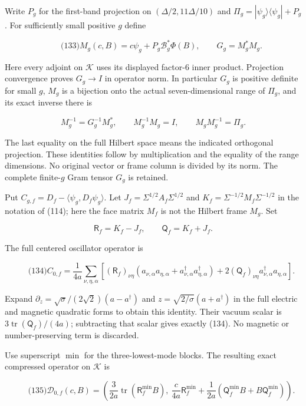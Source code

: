 Write \(P_g\) for the first-band projection on
\((\Delta/2,11\Delta/10)\) and
\(\Pi_g=|\psi_g\rangle\langle\psi_g|+P_g\). For sufficiently small
positive \(g\) define

\[
\qquad\text{(133)}
 M_g(c,B)=c\psi_g+P_g\mathcal B_g^*\Phi(B),\qquad G_g=M_g^*M_g.
\]

Here every adjoint on \(\mathcal K\) uses its displayed factor-\(6\)
inner product. Projection convergence proves \(G_g\to I\) in operator
norm. In particular \(G_g\) is positive definite for small \(g\),
\(M_g\) is a bijection onto the actual seven-dimensional range of
\(\Pi_g\), and its exact inverse there is

\[
M_g^{-1}=G_g^{-1}M_g^*,\qquad
 M_g^{-1}M_g=I,\qquad M_gM_g^{-1}=\Pi_g.
\]

The last equality on the full Hilbert space means the indicated
orthogonal projection. These identities follow by multiplication and the
equality of the range dimensions. No original vector or frame column is
divided by its norm. The complete finite-\(g\) Gram tensor \(G_g\) is
retained.

Put \(C_{g,f}=D_f-\langle\psi_g,D_f\psi_g\rangle\). Let
\(J_f=\Sigma^{1/2}A_f\Sigma^{1/2}\) and
\(K_f=\Sigma^{-1/2}M_f\Sigma^{-1/2}\) in the notation of (114); here the
face matrix \(M_f\) is not the Hilbert frame \(M_g\). Set

\[
\mathsf R_f=K_f-J_f,\qquad \mathsf Q_f=K_f+J_f.
\]

The full centered oscillator operator is

\[
\qquad\text{(134)}
 C_{0,f}=\frac1{4a}\sum_{\nu,\eta,\alpha}
 \left[(\mathsf R_f)_{\nu\eta}
 (a_{\nu,\alpha}a_{\eta,\alpha}
       +a_{\nu,\alpha}^\dagger a_{\eta,\alpha}^\dagger)
       +2(\mathsf Q_f)_{\nu\eta}
                      a_{\nu,\alpha}^\dagger a_{\eta,\alpha}\right].
\]

Expand \(\partial_z=\sqrt{\sigma}/(2\sqrt2)(a-a^\dagger)\) and
\(z=\sqrt{2/\sigma}(a+a^\dagger)\) in the full electric and magnetic
quadratic forms to obtain this identity. Their vacuum scalar is
\(3\operatorname{tr}(\mathsf Q_f)/(4a)\); subtracting that scalar gives
exactly (134). No magnetic or number-preserving term is discarded.

Use superscript \(\min\) for the three-lowest-mode blocks. The resulting
exact compressed operator on \(\mathcal K\) is

\[
\qquad\text{(135)}
 \mathcal D_{0,f}(c,B)=
 \left(\frac{3}{2a}\operatorname{tr}(\mathsf R_f^{\min}B),
 \ \frac{c}{4a}\mathsf R_f^{\min}
       +\frac1{2a}(\mathsf Q_f^{\min}B+B\mathsf Q_f^{\min})\right).
\]

